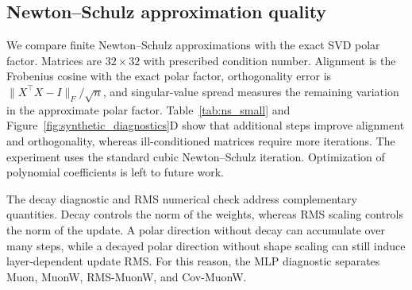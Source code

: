 \documentclass[sigconf,nonacm]{acmart}
\begin{document}
\subsection{Newton--Schulz approximation quality}\label{sec:ns_exp}
We compare finite Newton--Schulz approximations with the exact SVD polar factor. Matrices are $32\times32$ with prescribed condition number. Alignment is the Frobenius cosine with the exact polar factor, orthogonality error is $\|X^\top X-I\|_F/\sqrt{n}$, and singular-value spread measures the remaining variation in the approximate polar factor. Table~\ref{tab:ns_small} and Figure~\ref{fig:synthetic_diagnostics}D show that additional steps improve alignment and orthogonality, whereas ill-conditioned matrices require more iterations. The experiment uses the standard cubic Newton--Schulz iteration. Optimization of polynomial coefficients is left to future work.

\begin{table}[t]
    \centering
    \caption{Weight-decay control under bounded spectral updates. Random and adversarial polar-update sequences are compared with the radius $S/\lambda$.}
    \label{tab:decay_small}
    
\end{table}

\begin{table}[t]
    \centering
    \caption{Numerical SVD check of RMS alignment across matrix shapes. Exact-polar matrix-sign updates follow the $1/\sqrt{\max(m,n)}$ scaling for full-rank matrices.}
    \label{tab:rms_small}
    
\end{table}

\begin{table}[t]
    \centering
    \caption{Newton--Schulz approximation diagnostics. Alignment, orthogonality error, and singular-value spread are reported for each condition-number block.}
    \label{tab:ns_small}
    
\end{table}

The decay diagnostic and RMS numerical check address complementary quantities. Decay controls the norm of the weights, whereas RMS scaling controls the norm of the update. A polar direction without decay can accumulate over many steps, while a decayed polar direction without shape scaling can still induce layer-dependent update RMS. For this reason, the MLP diagnostic separates Muon, MuonW, RMS-MuonW, and Cov-MuonW.
\end{document}
